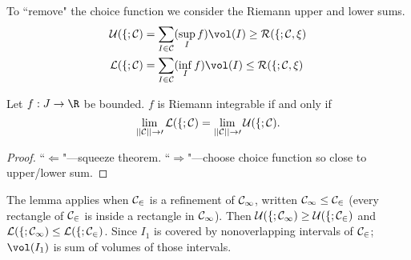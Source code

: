 To ``remove" the choice function we consider the Riemann upper and lower sums.
\begin{align*}
\cal U(f;\cal C)&=\sum_{I\in \cal C} (\sup_I f)\vol(I)\geq \cal R(f;\cal C,\xi)\\
\cal L(f;\cal C)&=\sum_{I\in \cal C} (\inf_I f)\vol(I)\leq \cal R(f;\cal C,\xi)
\end{align*}

\begin{pr}\label{l1-lequ}
Let $f:J\to \R$ be bounded. $f$ is Riemann integrable if and only if 
\[
\lim_{||\cal C||\to 0}\cal L(f;\cal C)=\lim_{||\cal C||\to 0} \cal U(f;\cal C).
\]
\end{pr}
\begin{proof}
``$\Leftarrow$"---squeeze theorem. ``$\Rightarrow$"---choose choice function so close to upper/lower sum.
\end{proof}

The lemma applies when $\cal C_2$ is a refinement of $\cal C_1$, written $\cal C_1\leq \cal C_2$ (every rectangle of $\cal C_2$ is inside a rectangle in $\cal C_1$). Then $\cal U(f;\cal C_1) \geq \cal U(f;\cal C_2)$ and $\cal L(f;\cal C_1) \leq \cal L(f;\cal C_2)$. Since $I_1$ is covered by nonoverlapping intervals of $\cal C_2$; $\vol(I_1)$ is sum of volumes of those intervals.